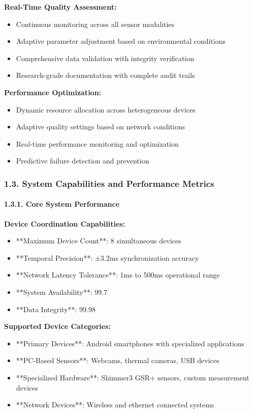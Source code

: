 \documentclass[12pt,a4paper]{article}
\begin{document}
\textbf{Real-Time Quality Assessment:}

\begin{itemize}
\item Continuous monitoring across all sensor modalities
\item Adaptive parameter adjustment based on environmental conditions
\item Comprehensive data validation with integrity verification
\item Research-grade documentation with complete audit trails

\end{itemize}
\textbf{Performance Optimization:}

\begin{itemize}
\item Dynamic resource allocation across heterogeneous devices
\item Adaptive quality settings based on network conditions
\item Real-time performance monitoring and optimization
\item Predictive failure detection and prevention

\end{itemize}
\subsubsection{1.3. System Capabilities and Performance Metrics}

\paragraph{1.3.1. Core System Performance}

\textbf{Device Coordination Capabilities:}

\begin{itemize}
\item **Maximum Device Count**: 8 simultaneous devices
\item **Temporal Precision**: ±3.2ms synchronization accuracy
\item **Network Latency Tolerance**: 1ms to 500ms operational range
\item **System Availability**: 99.7%
\item **Data Integrity**: 99.98%

\end{itemize}
\textbf{Supported Device Categories:}

\begin{itemize}
\item **Primary Devices**: Android smartphones with specialized applications
\item **PC-Based Sensors**: Webcams, thermal cameras, USB devices
\item **Specialized Hardware**: Shimmer3 GSR+ sensors, custom measurement devices
\item **Network Devices**: Wireless and ethernet connected systems

\end{itemize}
\end{document}
